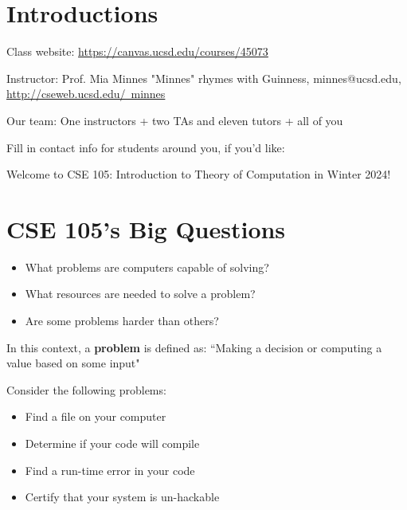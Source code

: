 \newpage

\section*{Introductions}
Class website: \href{https://canvas.ucsd.edu/courses/45073}{https://canvas.ucsd.edu/courses/45073}


Instructor: Prof. Mia Minnes {\tiny{"Minnes" rhymes with Guinness}}, minnes@ucsd.edu, 
\href{http://cseweb.ucsd.edu/~minnes}{http://cseweb.ucsd.edu/~minnes}


Our team: One instructors + two TAs and eleven tutors + all of you

Fill in contact info for students around you, if you'd like:

\vfill

\begin{comment}
On a typical week: {\bf MWF} Lectures + review quizzes, {\bf Tu} Homework due, {\bf WF} Discussion.
Office hours (hosted by instructors and TAs and tutors, where you can come to talk 
about course concepts and ask for help as you work through sample problems) and Q+A on Piazza available throughout the week.
All dates are on \href{https://canvas.ucsd.edu/}{Canvas (click for link)} and details are on
 \href{https://canvas.ucsd.edu/courses/45073}{the Syllabus page}.
\end{comment}

\newpage Welcome to CSE 105: Introduction to Theory of Computation in Winter 2024!

\section*{CSE 105's Big Questions}
\begin{itemize}
   \item What problems are computers capable of solving?
   \item What resources are needed to solve a problem?
   \item Are some problems harder than others?
\end{itemize}

In this context, a {\bf problem} is defined as: ``Making a decision or computing a value based on some input"

Consider the following problems: 
\begin{itemize}
   \item Find a file on your computer
   \item Determine if your code will compile
   \item Find a run-time error in your code
   \item Certify that your system is un-hackable
\end{itemize}

